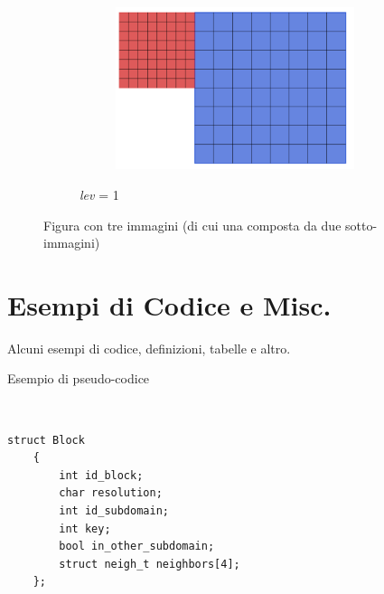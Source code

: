 \begin{figure}[H]
\begin{subfigure}{0.7\textwidth}
\begin{subfigure}{0.5\textwidth}
			\includegraphics[width=0.5\linewidth]{Immagini/bloccomaggiore2.png}
		\end{subfigure}
		\caption{\textit{lev} = 1}
		\label{fig:lev1}
	\end{subfigure}
	\caption{Figura con tre immagini (di cui una composta da due sotto-immagini)}
	\label{fig:three}
\end{figure}

\section{Esempi di Codice e Misc.}\label{sec:code}
Alcuni esempi di codice, definizioni, tabelle e altro.

\begin{algorithm}[ht]
	\caption{Esempio di pseudo-codice}
	\label{alg:Prim_Mst}
	\begin{algorithmic}[1]
		\Statex
		\\
		\EndFor
		\EndIf
		\EndFor
		\EndWhile
		\State \Return{}
		\EndFunction
	\end{algorithmic}
\end{algorithm}

\begin{minipage}{\textwidth}
\begin{lstlisting}[caption={Esempio di definizione struttura dati C++, ma non algoritmo},
	label={lst:block_struct}]
	struct Block
	{
		int id_block;
		char resolution;
		int id_subdomain;
		int key;
		bool in_other_subdomain;
		struct neigh_t neighbors[4];
	};
\end{lstlisting}
\end{minipage}



